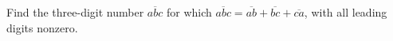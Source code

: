 Find the three-digit number $\overline{abc}$ for which $\overline{abc}=\overline{ab}+\overline{bc}+\overline{ca}$, with all leading digits nonzero.
